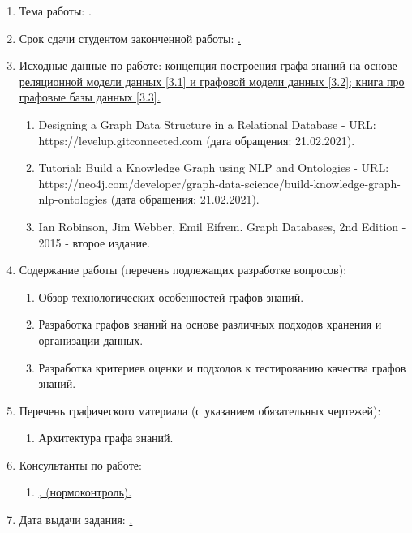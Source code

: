 \begin{enumerate}[1.]
\item Тема работы: {\expandafter \ulined \thesisTitle.}
\item Срок сдачи студентом законченной работы: \uline{\thesisDeadline.}
\item Исходные данные по работе: \uline{концепция построения графа знаний на основе реляционной модели данных [3.1] и графовой модели данных [3.2]; книга про графовые базы данных [3.3].}
\begin{enumerate}[label=\theenumi\arabic*.]
\item Designing a Graph Data Structure in a Relational Database - URL: https://levelup.gitconnected.com (дата обращения: 21.02.2021).
\item Tutorial: Build a Knowledge Graph using NLP and Ontologies - URL: https://neo4j.com/developer/graph-data-science/build-knowledge-graph-nlp-ontologies (дата обращения: 21.02.2021).
\item Ian Robinson, Jim Webber, Emil Eifrem. Graph Databases, 2nd Edition - 2015 - второе издание.
\end{enumerate}
\printbibliographyTask %
\item Содержание работы (перечень подлежащих разработке вопросов):
\begin{enumerate}[label=\theenumi\arabic*.]
\item Обзор технологических особенностей графов знаний.
\item Разработка графов знаний на основе различных подходов хранения и организации данных.
\item Разработка критериев оценки и подходов к тестированию качества графов знаний.
\end{enumerate}
\item Перечень графического материала (с указанием обязательных чертежей):
\begin{enumerate}[label=\theenumi\arabic*.]
\item Архитектура графа знаний.
\end{enumerate}
\item Консультанты по работе:
\begin{enumerate}[label=\theenumi\arabic*.]
\item \uline{\emakefirstuc{\ConsultantNormDegree}, \ConsultantNorm{} (нормоконтроль).} %
\end{enumerate}
\item Дата выдачи задания: \uline{\thesisStartDate.}
\end{enumerate}

